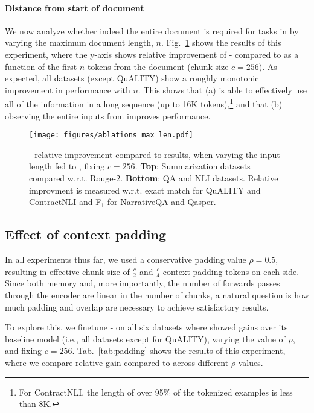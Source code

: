 \paragraph{Distance from start of document}
We now analyze whether indeed the entire document is required for tasks in \SCROLLS{} by varying the maximum document length, $n$.
Fig.~\ref{fig:ab-length} shows the results of this experiment, where the y-axis shows relative improvement of \bartbase{}-\sled{} compared to \bartbase{} as a function of the first $n$ tokens from the document (chunk size $c=256$). As expected, all datasets (except QuALITY) show a roughly monotonic improvement in performance with $n$. 
This shows that
(a) \sled{} is able to effectively use all of the information in a long sequence (up to 16K tokens),\footnote{For ContractNLI, the length of over 95\% of the tokenized examples is less than 8K.} and that (b) observing the entire inputs from \SCROLLS{} improves performance.
\begin{figure}[t]
\begin{center}


\centerline{
\texttt{[image: figures/ablations\_max\_len.pdf]}
}
\setlength{\belowcaptionskip}{-20pt}
\caption{\bartbase{}-\sled{} relative improvement compared to \bartbase{} results, when varying the input length fed to \sled{}, fixing $c=256$. \textbf{Top}: Summarization datasets compared w.r.t. Rouge-2. \textbf{Bottom}: QA and NLI datasets. Relative improvment is measured w.r.t. exact match for QuALITY and ContractNLI and F$_1$ for NarrativeQA and Qasper.}
 

\label{fig:ab-length}
\end{center}
\end{figure} 
\subsection{Effect of context padding}
In all experiments thus far, we used a conservative padding value $\rho=0.5$, resulting in effective chunk size of $\frac{c}{2}$ and $\frac{c}{4}$ context padding tokens on each side.
Since both memory and, more importantly, the number of forwards passes through the encoder are linear in the number of chunks, a natural question is how much padding and overlap are necessary to achieve satisfactory results. 

To explore this, we finetune \bartbase{}-\sled{} on all six datasets  where \sled{} showed gains over its baseline model (i.e., all datasets except for QuALITY), varying the value of $\rho$, and fixing $c=256$. Tab.~\ref{tab:padding} shows the results of this experiment, where we compare relative gain compared to \bartbase{} across different $\rho$ values.

